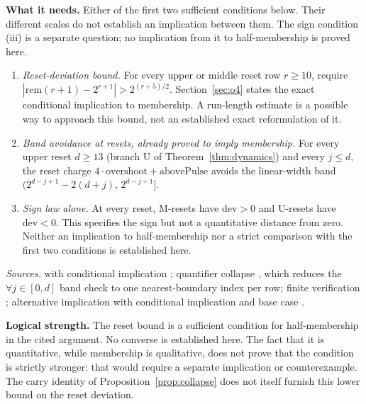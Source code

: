 \textbf{What it needs.} Either of the first two sufficient conditions
below. Their different scales do not establish an implication between
them. The sign condition (iii) is a separate question; no implication
from it to half-membership is proved here.
\begin{enumerate}[nosep,label=(\roman*)]
\item \emph{Reset-deviation bound.} For every upper or middle reset
  row $r\ge10$, require
  $|\mathrm{rem}(r+1)-2^{r+1}|>2^{(r+5)/2}$.
  Section~\ref{sec:o4} states the exact conditional implication to
  membership.  A run-length estimate is a possible way to approach
  this bound, not an established exact reformulation of it.
\item \emph{Band avoidance at resets, already proved to imply membership.}
  For every upper reset $d \ge 13$ (branch $\mathrm U$ of
  Theorem~\ref{thm:dynamics}) and every $j \le d$, the reset charge
  $4\cdot\text{overshoot} + \text{abovePulse}$ avoids the linear-width band
  $(2^{d-j+1} - 2(d+j),\, 2^{d-j+1}]$.
\item \emph{Sign law alone.} At every reset, M-resets have $\mathrm{dev} > 0$ and U-resets have
  $\mathrm{dev} < 0$. This specifies the sign but not a quantitative distance from zero.
  Neither an implication to half-membership nor a strict comparison with
  the first two conditions is established here.
\end{enumerate}
\textit{Sources.} 
with conditional implication
;
quantifier collapse ,
which reduces the $\forall j \in [0,d]$ band check to one nearest-boundary index per row; finite
verification ;
alternative implication  with
conditional implication
and base case
.

\textbf{Logical strength.} The reset bound is a sufficient condition for
half-membership in the cited argument.  No converse is established here.
The fact that it is quantitative, while membership is qualitative, does
not prove that the condition is strictly stronger: that would require a
separate implication or counterexample.  The carry identity of
Proposition~\ref{prop:collapse} does not itself furnish this lower bound
on the reset deviation.

